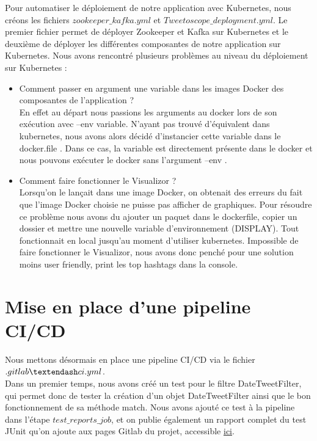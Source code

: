 \documentclass{article}
\begin{document}
Pour automatiser le déploiement de notre application avec Kubernetes, nous créons les fichiers $zookeeper\_kafka.yml$ et $Tweetoscope\_deployment.yml$. Le premier fichier permet de déployer Zookeeper et Kafka sur Kubernetes et le deuxième de déployer les différentes composantes de notre application sur Kubernetes. Nous avons rencontré plusieurs problèmes au niveau du déploiement sur Kubernetes : \\
\begin{itemize}
    \item Comment passer en argument une variable dans les images Docker des composantes de l'application ? \\
    En effet au départ nous passions les arguments au docker lors de son exécution avec --env variable.
    N'ayant pas trouvé d'équivalent dans kubernetes, nous avons alors décidé d'instancier cette variable dans le docker.file . Dans ce cas, la variable est directement présente dans le docker et nous pouvons exécuter le docker sans l'argument --env . 
    \\
    \item Comment faire fonctionner le Visualizor ?\\
 Lorsqu'on le lançait dans une image Docker, on obtenait des erreurs du fait que l'image Docker choisie ne puisse pas afficher de graphiques. Pour résoudre ce problème nous avons du ajouter un paquet dans le dockerfile, copier un dossier et mettre une nouvelle variable d'environnement (DISPLAY). Tout fonctionnait en local jusqu'au moment d'utiliser kubernetes. Impossible de faire fonctionner le Visualizor, nous avons donc penché pour une solution moins user friendly, print les top hashtags dans la console.
\end{itemize}

\section{Mise en place d'une pipeline CI/CD}
Nous mettons désormais en place une pipeline CI/CD via le fichier $.gitlab\textendash ci.yml$. \\

Dans un premier temps, nous avons créé un test pour le filtre DateTweetFilter, qui permet donc de tester la création d'un objet DateTweetFilter ainsi que le bon fonctionnement de sa méthode match. Nous avons ajouté ce test à la pipeline dans l'étape $test\_reports\_job$, et on publie également un rapport complet du test JUnit qu'on ajoute aux pages Gitlab du projet, accessible \href{https://maxime.raillat.pages-student.centralesupelec.fr/tweetoscope22_group-3_ollivier1_levi2_raillat3/testCoverageReport/}{ici}.\\
\end{document}
